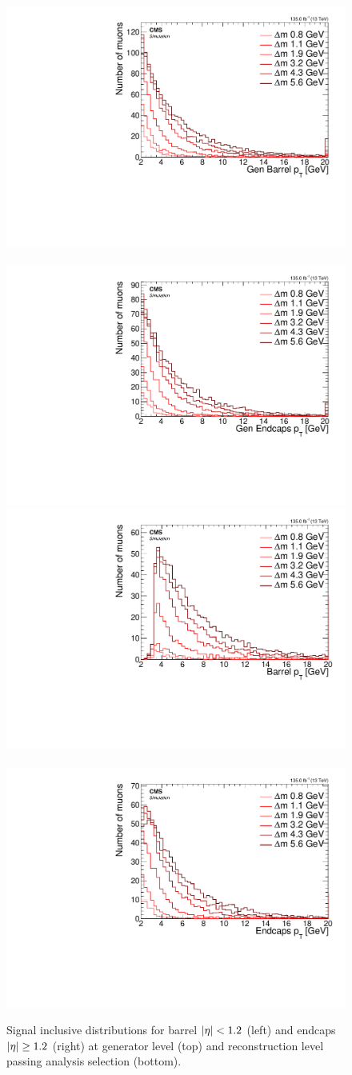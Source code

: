 \begin{figure}[!htb]
\centering
\includegraphics[width=0.48\linewidth]{plots/signal_muons_gen/none_Muons_pt_barrel.pdf} \,
\includegraphics[width=0.48\linewidth]{plots/signal_muons_gen/none_Muons_pt_endcape.pdf}  \\
\includegraphics[width=0.48\linewidth]{plots/signal_muons/none_Muons_pt_barrel.pdf} \,
\includegraphics[width=0.48\linewidth]{plots/signal_muons/none_Muons_pt_endcape.pdf}  \\
\caption[Signal \pt distributions split into barrel and endcaps]{ Signal inclusive \pt distributions for barrel $\abs{\eta} < 1.2$ (left) and endcaps $\abs{\eta} \geq 1.2$ (right) at generator level (top) and reconstruction level passing analysis selection (bottom).}
\label{fig:signal-pt-barrel-endcaps}
\end{figure}

